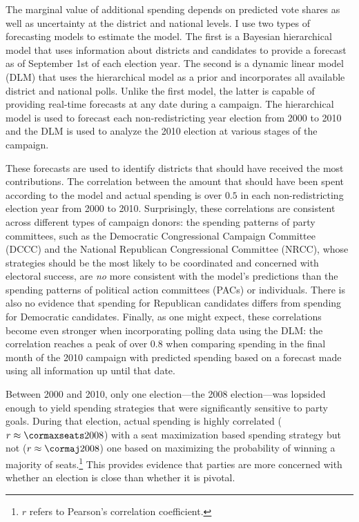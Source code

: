 \documentclass[12pt,final,fleqn]{article}
\theoremstyle{plain}
\begin{document}
The marginal value of additional spending depends on predicted vote shares as well as uncertainty at the district and national levels. I use two types of forecasting models to estimate the model. The first is a Bayesian hierarchical model that uses information about districts and candidates to provide a forecast as of September 1st of each election year. The second is a dynamic linear model (DLM) that uses the hierarchical model as a prior and incorporates all available district and national polls. Unlike the first model, the latter is capable of providing real-time forecasts at any date during a campaign. The hierarchical model is used to forecast each non-redistricting year election from 2000 to 2010 and the DLM is used to analyze the 2010 election at various stages of the campaign.

These forecasts are used to identify districts that should have received the most contributions. The correlation between the amount that should have been spent according to the model and actual spending is over $0.5$ in each non-redistricting election year from 2000 to 2010. Surprisingly, these correlations are consistent across different types of campaign donors: the spending patterns of party committees, such as the Democratic Congressional Campaign Committee (DCCC) and the National Republican Congressional Committee (NRCC), whose strategies should be the most likely to be coordinated and concerned with electoral success, are \emph{no} more consistent with the model's predictions than the spending patterns of political action committees (PACs) or individuals. There is also no evidence that spending for Republican candidates differs from spending for Democratic candidates. Finally, as one might expect, these correlations become even stronger when incorporating polling data using the DLM: the correlation reaches a peak of over 0.8 when comparing spending in the final month of the 2010 campaign with predicted spending based on a forecast made using all information up until that date.

Between 2000 and 2010, only one election---the 2008 election---was lopsided enough to yield spending strategies that were significantly sensitive to party goals. During that election, actual spending is highly correlated ($r \approx \cormaxseats2008$) with a seat maximization based spending strategy but not ($r \approx \cormaj2008$) one based on maximizing the probability of winning a majority of seats.\footnote{$r$ refers to Pearson's correlation coefficient.} This provides evidence that parties are more concerned with whether an election is close than whether it is pivotal. 
\end{document}
